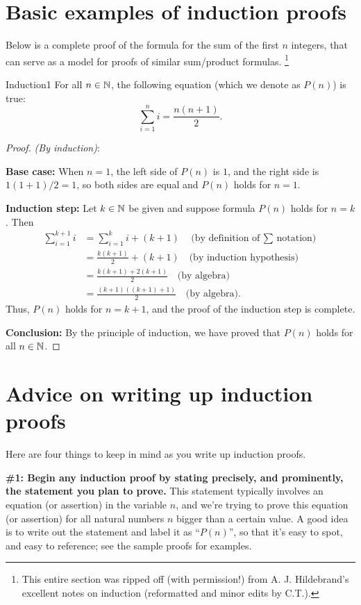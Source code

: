 

\section{ Basic examples of induction proofs}\label{sec:basic_induction}

Below is a complete proof of the
formula for the sum of the first $n$ integers, that can serve as a model
for proofs of similar sum/product formulas. \footnote{This entire section was ripped off (with permission!) from A. J. Hildebrand's excellent notes on induction (reformatted and minor edits  by C.T.).}

\begin{prop}{Induction1} For all $n\in\mathbb{N}$, the following equation (which we denote as $P(n)$)  is true:
\[
\sum_{i=1}^n i=\frac{n(n+1)}{2}.
\tag{$P(n)$}
\]
\end{prop}
\begin{proof} \emph{(By induction)}:

\noindent
\textbf{Base case:} When $n=1$, the left side of $P(n)$ is $1$, and the
right side is $1(1+1)/2=1$, so both sides are equal and $P(n)$ holds  
for $n=1$.

\noindent
\textbf{Induction step:} Let $k\in\mathbb{N}$ be given and suppose 
formula $P(n)$ holds for $n=k$. Then
\begin{align*}
\sum_{i=1}^{k+1}i&=\sum_{i=1}^k i + (k+1)\quad\text{(by 
definition of $\sum$ notation)}
\\
&=\frac{k(k+1)}{2}+(k+1)\quad \text{(by induction hypothesis)}
\\
&=\frac{k(k+1)+2(k+1)}{2}\quad \text{(by algebra)}
\\
&=\frac{(k+1)((k+1)+1)}{2}\quad \text{(by algebra)}.
\end{align*}
Thus, $P(n)$ holds for $n=k+1$, and the proof of the induction step is complete. 

\noindent
\textbf{Conclusion:} By the principle of induction, 
we have proved that $P(n)$ holds for all $n\in\mathbb{N}$.  
\end{proof}


\section{Advice on writing up induction proofs}
Here are four things to keep in mind as you write up induction proofs.

\noindent
 \textbf{\#1: Begin any induction proof by stating precisely, 
and prominently, the
statement  you plan to prove.} 
This statement typically involves an equation (or assertion) in the variable $n$, and we're trying to prove this equation (or assertion) for all natural numbers $n$ bigger than a certain value.  A good idea is to write out the statement and label it as ``$P(n)$'', so that it's easy to spot, and easy to reference; see the sample proofs for
examples.

